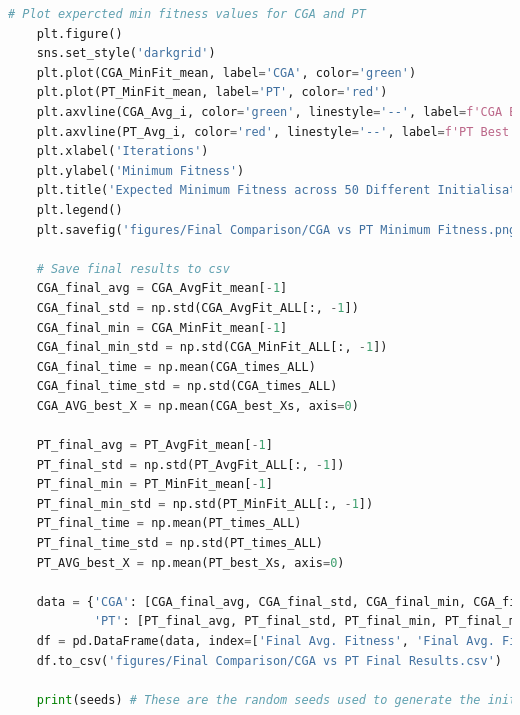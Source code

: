 \documentclass[10pt]{article}
\begin{document}
\begin{lstlisting}[language=Python, caption=FinalComparison.py, label=FinalComparisonpy]
    # Plot expercted min fitness values for CGA and PT 
    plt.figure()
    sns.set_style('darkgrid')
    plt.plot(CGA_MinFit_mean, label='CGA', color='green')
    plt.plot(PT_MinFit_mean, label='PT', color='red')
    plt.axvline(CGA_Avg_i, color='green', linestyle='--', label=f'CGA Best Converges at {int(CGA_Avg_i)} Iterations on Avg.')
    plt.axvline(PT_Avg_i, color='red', linestyle='--', label=f'PT Best Convergence at {int(PT_Avg_i)} Iterations on Avg.')
    plt.xlabel('Iterations')
    plt.ylabel('Minimum Fitness')
    plt.title('Expected Minimum Fitness across 50 Different Initialisations')
    plt.legend()
    plt.savefig('figures/Final Comparison/CGA vs PT Minimum Fitness.png', dpi=300)
    
    # Save final results to csv
    CGA_final_avg = CGA_AvgFit_mean[-1]
    CGA_final_std = np.std(CGA_AvgFit_ALL[:, -1])
    CGA_final_min = CGA_MinFit_mean[-1]
    CGA_final_min_std = np.std(CGA_MinFit_ALL[:, -1])
    CGA_final_time = np.mean(CGA_times_ALL)
    CGA_final_time_std = np.std(CGA_times_ALL)
    CGA_AVG_best_X = np.mean(CGA_best_Xs, axis=0)
    
    PT_final_avg = PT_AvgFit_mean[-1]
    PT_final_std = np.std(PT_AvgFit_ALL[:, -1])
    PT_final_min = PT_MinFit_mean[-1]
    PT_final_min_std = np.std(PT_MinFit_ALL[:, -1])
    PT_final_time = np.mean(PT_times_ALL)
    PT_final_time_std = np.std(PT_times_ALL)
    PT_AVG_best_X = np.mean(PT_best_Xs, axis=0)
    
    data = {'CGA': [CGA_final_avg, CGA_final_std, CGA_final_min, CGA_final_min_std, CGA_final_time, CGA_final_time_std, CGA_Avg_i, CGA_AVG_best_X],
            'PT': [PT_final_avg, PT_final_std, PT_final_min, PT_final_min_std, PT_final_time, PT_final_time_std, PT_Avg_i, PT_AVG_best_X]}
    df = pd.DataFrame(data, index=['Final Avg. Fitness', 'Final Avg. Fitness Std', 'Final Min. Fitness', 'Final Min. Fitness Std', 'Total Time Taken', 'Time Taken Std', 'Mean Iters to Convergence', 'Mean Best Solution'])
    df.to_csv('figures/Final Comparison/CGA vs PT Final Results.csv')
    
    print(seeds) # These are the random seeds used to generate the initial populations    
\end{lstlisting}
\end{document}
